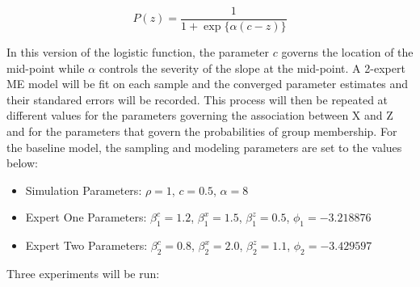 \documentclass[12pt]{article}
\theoremstyle{definition}
\begin{document}
\begin{equation} \label{eq:general_logistic}
    P(z) = \frac{1}{1 + \exp\{\alpha (c - z)\}}
\end{equation}

In this version of the logistic function, the parameter $c$ governs the location of the mid-point while $\alpha$ controls the severity of the slope at the mid-point. A 2-expert ME model will be fit on each sample and the converged parameter estimates and their standared errors will be recorded. This process will then be repeated at different values for the parameters governing the association between X and Z and for the parameters that govern the probabilities of group membership. For the baseline model, the sampling and modeling parameters are set to the values below:

\begin{itemize}
    \item Simulation Parameters: $\rho = 1$,\; $c = 0.5$,\; $\alpha = 8$
    \item Expert One Parameters: $\beta_{1}^{c} = 1.2$, \; $\beta_{1}^{x} = 1.5$, \; $\beta_{1}^{z} = 0.5$, \; $\phi_{1} = -3.218876$
    \item Expert Two Parameters: $\beta_{2}^{c} = 0.8$, \; $\beta_{2}^{x} = 2.0$, \; $\beta_{2}^{z} = 1.1$, \; $\phi_{2} = -3.429597$
\end{itemize}

Three experiments will be run:
\end{document}
